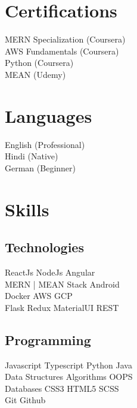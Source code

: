 \documentclass[]{deedy-resume-openfont}
\begin{document}
\begin{minipage}[t]{0.33\textwidth}

\section{Certifications}
MERN Specialization (Coursera) \\
AWS Fundamentals (Coursera) \\
Python (Coursera) \\
MEAN (Udemy) \\
\sectionsep
\section{Languages}
English (Professional) \\
Hindi (Native) \\
German (Beginner) \\
\sectionsep

\section{Skills}
\subsection{Technologies}
ReactJs \textbullet{} NodeJs \textbullet{} Angular \\
MERN | MEAN Stack \textbullet{} Android \\
Docker \textbullet{} AWS \textbullet{} GCP \\
Flask \textbullet{} Redux \textbullet{} MaterialUI \textbullet{} REST \\
\sectionsep

\subsection{Programming}
Javascript \textbullet{}   Typescript \textbullet{} Python \textbullet{} Java \\
Data Structures \textbullet{}   Algorithms \textbullet{} OOPS \\
Databases \textbullet{} CSS3 \textbullet{} HTML5 \textbullet{} SCSS \\
Git \textbullet{} Github \\ 
%
%

\end{minipage} 
\end{document}
